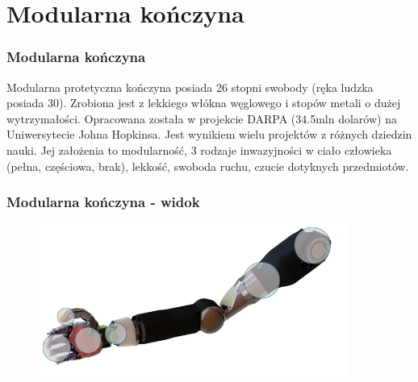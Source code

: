 \documentclass[8pt]{beamer}
\begin{document}
\section{Modularna kończyna}
\begin{frame}
\frametitle{Modularna kończyna}
Modularna protetyczna kończyna posiada 26 stopni swobody (ręka ludzka posiada 30). Zrobiona jest z lekkiego włókna węglowego i stopów metali o dużej wytrzymałości.
Opracowana została w projekcie DARPA (34.5mln dolarów) na Uniwersytecie Johna Hopkinsa. Jest wynikiem wielu projektów z różnych dziedzin nauki. Jej założenia to modularność, 3 rodzaje inwazyjności w ciało człowieka (pełna, częściowa, brak), lekkość, swoboda ruchu, czucie dotyknych przedmiotów.
\end{frame}
\begin{frame}
\frametitle{Modularna kończyna - widok}
\begin{figure}[htbp]
  \begin{center}
    \includegraphics[width=0.9\textwidth]{graphics/arm.jpg}
  \end{center}
 \end{figure} 
\end{frame}
\end{document}
